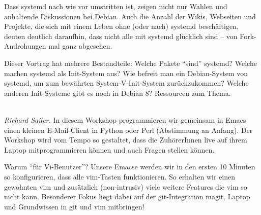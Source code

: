 \documentclass[10pt,a4paper,ngerman]{scrartcl}
\let\origdescription\description
\renewenvironment{description}{
  \setlength{\leftmargini}{0em}
  \origdescription
  \setlength{\itemindent}{0em}
  \setlength{\itemsep}{1.2em}
  \setlength{\labelsep}{\textwidth}
}
{\endlist}
\newcommand{\vorschub}{\mbox{}\\[-0.5em]}
\begin{document}
\begin{multicols}{2}
\begin{description}
Dass systemd nach wie vor umstritten ist, zeigen nicht nur Wahlen und anhaltende Diskussionen bei Debian. Auch die Anzahl der Wikis, Webseiten und Projekte, die sich mit einem Leben ohne (oder nach) systemd beschäftigen, deuten deutlich daraufhin, dass nicht alle mit systemd glücklich sind – von Fork-Androhungen mal ganz abgesehen.

Dieser Vortrag hat mehrere Bestandteile: Welche Pakete "`sind"' systemd? Welche machen systemd als Init-System aus? Wie befreit man ein Debian-System von systemd, um zum bewährten System-V-Init-System zurückzukommen? Welche anderen Init-Systeme gibt es noch in Debian 8? Ressourcen zum Thema.

\end{description}

\end{multicols}

\vfill
\begin{center}\parbox{0.6\textwidth}{%
\begin{description}
\item[Workshop von 10:45 Uhr bis 12:30 Uhr: Git und Emacs für Vi-Benutzer]\vorschub
\textsl{Richard Sailer.}
In diesem Workshop programmieren wir gemeinsam in Emacs einen kleinen E-Mail-Client in Python oder Perl (Abstimmung an Anfang). Der Workshop wird vom Tempo so gestaltet, dass die ZuhörerInnen live auf ihrem Laptop mitprogrammieren können und auch Fragen stellen können.

Warum "`für Vi-Benutzer"'? Unsere Emacse werden wir in den ersten 10 Minuten so konfigurieren, dass alle vim-Tasten funktionieren. So erhalten wir einen gewohnten vim und zusätzlich (non-intrusiv) viele weitere Features die vim so nicht kann.
Besonderer Fokus liegt dabei auf der git-Integration magit. Laptop und Grundwissen in git und vim mitbringen!
\end{description}
}\end{center}

\newpage
\end{document}

